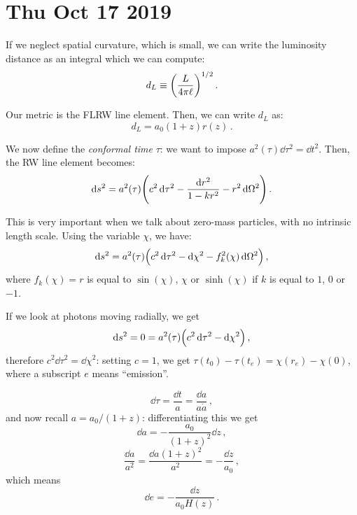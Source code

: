 \documentclass[main.tex]{subfiles}
\begin{document}
\section*{Thu Oct 17 2019}

If we neglect spatial curvature, which is small, we can write the luminosity distance as an integral which we can compute:
%
\begin{equation}
  d_L \equiv \qty(\frac{L}{4 \pi \ell})^{1/2}
\,.
\end{equation}
%

Our metric is the FLRW line element. Then, we can write \(d_L\) as: 
%
\begin{equation}
  d_L = a_0 (1+z) r(z)
\,.
\end{equation}
%

We now define the \emph{conformal time} \(\tau\): we want to impose \(a^2(\tau ) \dd{\tau^2} = \dd{t^2}  \).
Then, the RW line element becomes: 
%
\begin{equation}
  \dd{s^2} = a^2(\tau ) \qty(c^2 \dd{\tau^2} - \frac{\dd{r^2} }{1 - k r^2} - r^2 \dd{\Omega^2} )
\,.
\end{equation}

This is very important when we talk about zero-mass particles, with no intrinsic length scale.
Using the variable \(\chi\), we have: 
%
\begin{equation}
  \dd{s^2}  = a^2(\tau ) \qty(c^2 \dd{\tau^2} - \dd{\chi^2} - f^2_k (\chi ) \dd{\Omega^2})
\,,
\end{equation}
%
where \(f_k(\chi )=r\) is equal to \(\sin(\chi ) \), \(\chi \) or \(\sinh(\chi )\) if \(k\) is equal to \(1\), \(0\) or \(-1\).

If we look at photons moving radially, we get 
%
\begin{equation}
  \dd{s^2} = 0 = a^2(\tau ) \qty(c^2 \dd{\tau^2} - \dd{\chi^2})
\,,
\end{equation}
%
therefore \(c^2 \dd{\tau^2} = \dd{\chi^2}\): setting \(c=1\), we get \(\tau (t_0 ) - \tau (t_e) = \chi (r_e) - \chi (0)\), where a subscript \(e\) means ``emission''. 

\begin{equation}
  \dd{\tau} = \frac{\dd{t} }{a}  = \frac{\dd{a} }{a \dot{a} }
\,,
\end{equation}
%
and now recall \(a = a_0 /(1+z)\): differentiating this we get
%
\begin{equation}
  \dd{a} = - \frac{a_0 }{(1+z)^2} \dd{z}
\,,
\end{equation}
%
\begin{equation}
  \frac{\dd{a}}{a^2} = \frac{\dd{a} (1+z)^2}{a^2} = - \frac{\dd{z}}{ a_0 }
\,,
\end{equation}
%
which means 
%
\begin{equation}
  \dd{e} = - \frac{\dd{z}}{a_0 H(z)}
  \,.
\end{equation}
\end{document}
